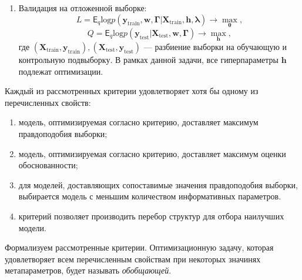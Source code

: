 \begin{enumerate}
\item Валидация на отложенной выборке:
\begin{equation}
\label{eq:optim_hold_out}
    L = \mathsf{E}_q \text{log}p(\mathbf{y}_\text{train}, \mathbf{w}, \boldsymbol{\Gamma}|\mathbf{X}_\text{train}, \mathbf{h}, \boldsymbol{\lambda}) \to \max_{\boldsymbol{\theta}},
\end{equation}
\[
    Q = \mathsf{E}_q \text{log}p(\mathbf{y}_\text{test}|\mathbf{X}_\text{test}, \mathbf{w}, \boldsymbol{\Gamma}) \to \max_{\mathbf{h}},
\]
где $(\mathbf{X}_\text{train}, \mathbf{y}_\text{train}), (\mathbf{X}_\text{test}, \mathbf{y}_\text{test})$ --- разбиение выборки на обучающую и контрольную подвыборку.
В рамках данной задачи, все гиперпараметры $\mathbf{h}$ подлежат оптимизации.

\end{enumerate}

Каждый из рассмотренных критерии удовлетворяет хотя бы одному из перечисленных свойств:
\begin{enumerate}[label={\arabic*)}]
\item модель, оптимизируемая согласно критерию, доставляет максимум правдоподобия выборки;
\item модель, оптимизируемая согласно критерию, доставляет максимум оценки обоснованности;
\item для моделей, доставляющих сопоставимые значения правдоподобия выборки, выбирается модель с меньшим количеством информативных параметров.
\item критерий позволяет производить перебор структур для отбора наилучших модели.
\end{enumerate}

Формализуем рассмотренные критерии. Оптимизационную задачу, которая удовлетворяет всем перечисленным свойствам при некоторых значинях метапараметров, будет называть \textit{обобщающей}.

